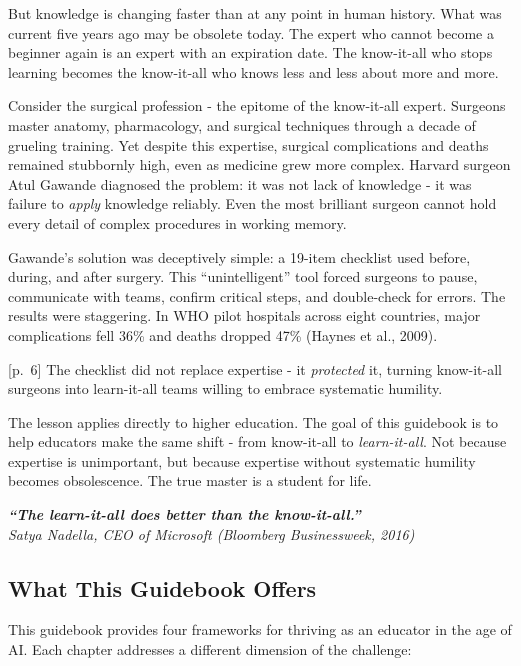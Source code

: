 \documentclass[
  letterpaper,
  DIV=11,
  numbers=noendperiod]{scrreprt}
\begin{document}
But knowledge is changing faster than at any point in human history.
What was current five years ago may be obsolete today. The expert who
cannot become a beginner again is an expert with an expiration date. The
know-it-all who stops learning becomes the know-it-all who knows less
and less about more and more.

Consider the surgical profession - the epitome of the know-it-all
expert. Surgeons master anatomy, pharmacology, and surgical techniques
through a decade of grueling training. Yet despite this expertise,
surgical complications and deaths remained stubbornly high, even as
medicine grew more complex. Harvard surgeon Atul Gawande diagnosed the
problem: it was not lack of knowledge - it was failure to \emph{apply}
knowledge reliably. Even the most brilliant surgeon cannot hold every
detail of complex procedures in working memory.

Gawande's solution was deceptively simple: a 19-item checklist used
before, during, and after surgery. This ``unintelligent'' tool forced
surgeons to pause, communicate with teams, confirm critical steps, and
double-check for errors. The results were staggering. In WHO pilot
hospitals across eight countries, major complications fell 36\% and
deaths dropped 47\% (Haynes et al., 2009).

{[}p.~6{]} The checklist did not replace expertise - it \emph{protected}
it, turning know-it-all surgeons into learn-it-all teams willing to
embrace systematic humility.

The lesson applies directly to higher education. The goal of this
guidebook is to help educators make the same shift - from know-it-all to
\emph{learn-it-all}. Not because expertise is unimportant, but because
expertise without systematic humility becomes obsolescence. The true
master is a student for life.

\textbf{\emph{``The learn-it-all does better than the know-it-all.''}}\\
\emph{Satya Nadella, CEO of Microsoft (Bloomberg Businessweek, 2016)}

\subsection{What This Guidebook
Offers}\label{what-this-guidebook-offers}

This guidebook provides four frameworks for thriving as an educator in
the age of AI. Each chapter addresses a different dimension of the
challenge:
\end{document}
